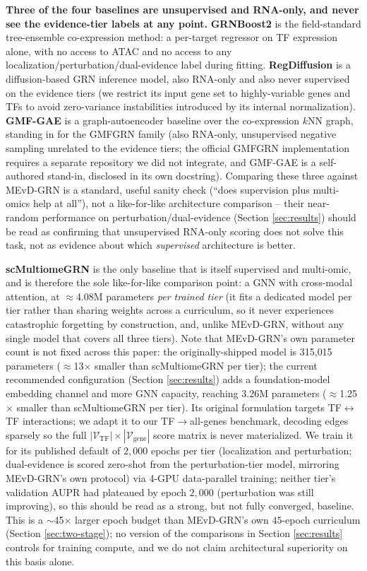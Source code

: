 \documentclass{article}
\theoremstyle{plain}
\theoremstyle{definition}
\begin{document}
\textbf{Three of the four baselines are unsupervised and RNA-only, and
never see the evidence-tier labels at any point.} \textbf{GRNBoost2}
\cite{moerman2019grnboost2} is the field-standard tree-ensemble
co-expression method: a per-target regressor on TF expression alone, with no
access to ATAC and no access to any localization/perturbation/dual-evidence
label during fitting. \textbf{RegDiffusion} \cite{zhu2024regdiffusion} is a
diffusion-based GRN inference model, also RNA-only and also never
supervised on the evidence tiers (we restrict its input gene set to
highly-variable genes and TFs to avoid zero-variance instabilities
introduced by its internal normalization). \textbf{GMF-GAE} is a
graph-autoencoder baseline over the co-expression $k$NN graph, standing in
for the GMFGRN family \cite{li2024gmfgrn} (also RNA-only, unsupervised
negative sampling unrelated to the evidence tiers; the official GMFGRN
implementation requires a separate repository we did not integrate, and
GMF-GAE is a self-authored stand-in, disclosed in its own docstring).
Comparing these three against MEvD-GRN is a standard, useful sanity check
(``does supervision plus multi-omics help at all''), not a like-for-like
architecture comparison -- their near-random performance on
perturbation/dual-evidence (Section \ref{sec:results}) should be read as
confirming that unsupervised RNA-only scoring does not solve this task, not
as evidence about which \emph{supervised} architecture is better.

\textbf{scMultiomeGRN} \cite{xu2025scmultiomegrn} is the only baseline that
is itself supervised and multi-omic, and is therefore the sole like-for-like
comparison point: a GNN with cross-modal attention, at $\approx$4.08M
parameters \emph{per trained tier} (it fits a dedicated model per tier
rather than sharing weights across a curriculum, so it never experiences
catastrophic forgetting by construction, and, unlike MEvD-GRN, without any
single model that covers all three tiers). Note that MEvD-GRN's own
parameter count is not fixed across this paper: the originally-shipped
model is 315{,}015 parameters ($\approx$13$\times$ smaller than
scMultiomeGRN per tier); the current recommended configuration
(Section \ref{sec:results}) adds a foundation-model embedding channel and
more GNN capacity, reaching 3.26M parameters ($\approx$1.25$\times$ smaller
than scMultiomeGRN per tier). Its original formulation targets
TF$\leftrightarrow$TF interactions; we adapt it to our TF$\to$all-genes
benchmark, decoding edges sparsely so the full
$|\mathcal{V}_{\text{TF}}|\times|\mathcal{V}_{\text{gene}}|$ score matrix is
never materialized. We train it for its published default of $2{,}000$
epochs per tier (localization and perturbation; dual-evidence is scored
zero-shot from the perturbation-tier model, mirroring MEvD-GRN's own
protocol) via 4-GPU data-parallel training; neither tier's validation AUPR
had plateaued by epoch $2{,}000$ (perturbation was still improving), so this
should be read as a strong, but not fully converged, baseline. This is a
$\sim$45$\times$ larger epoch budget than MEvD-GRN's own $45$-epoch
curriculum (Section \ref{sec:two-stage}); no version of the comparisons in
Section \ref{sec:results} controls for training compute, and we do not
claim architectural superiority on this basis alone.
\end{document}
